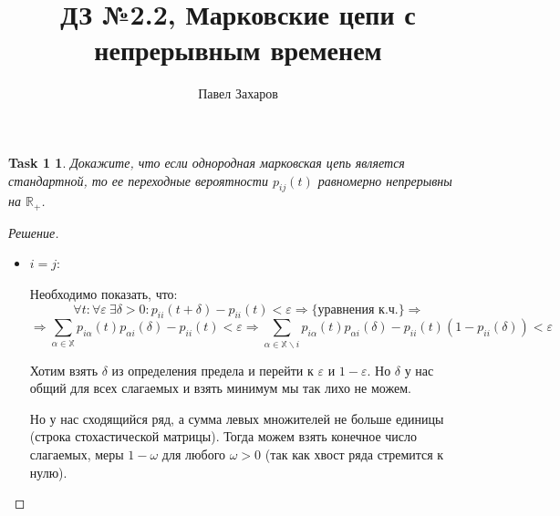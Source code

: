 \documentclass[12pt,a4paper]{extarticle}
\title{\Huge{ДЗ №2.2, Марковские цепи с непрерывным временем}}
\author{Павел Захаров}
\date{}
\newtheorem*{task1}{Task 1}
\newcommand{\X}{\mathbb{X}}
\newcommand{\R}{\mathbb{R}}
\newcommand{\e}{\varepsilon}
\begin{document}
	\maketitle

	
	\vspace{\baselineskip}

	
	
	\vspace{\baselineskip}
	\begin{task1}
		Докажите, что если однородная марковская цепь является стандартной, то
		ее переходные вероятности $p_{ij}(t)$ равномерно непрерывны на $\R_+$.
	\end{task1}
	\begin{proof}[Решение]
		\
		\begin{itemize}
			\item $i = j$:
			
			Необходимо показать, что:
			\[
				 \forall t: \forall \e ~\exists \delta > 0 : p_{ii}(t + \delta) - p_{ii}(t) < \e \Rightarrow \{\text{уравнения к.ч.}\} \Rightarrow
			\]
			\[
				\Rightarrow \sum_{\alpha \in \X} p_{i\alpha}(t) p_{\alpha i}(\delta) - p_{ii}(t) < \e
				\Rightarrow
				\sum_{\alpha \in \X \backslash i} p_{i\alpha}(t) p_{\alpha i}(\delta) - p_{ii}(t)(1-p_{ii}(\delta)) < \e
			\]
			
			Хотим взять $\delta$ из определения предела и перейти к $\e$ и $1-\e$. Но $\delta$ у нас общий для всех слагаемых и взять минимум мы так лихо не можем. 
			
			Но у нас сходящийся ряд, а сумма левых множителей не больше единицы (строка стохастической матрицы). Тогда можем взять конечное число слагаемых, меры $1 - \omega $ для любого $\omega > 0$ (так как хвост ряда стремится к нулю). 
			

\end{itemize}
\end{proof}
\end{document}
